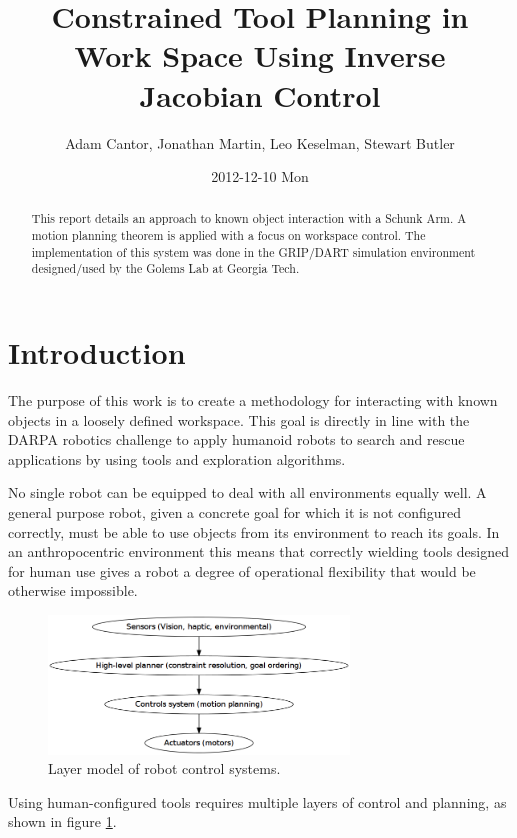 \documentclass[10pt, conference]{IEEEtran}
\title{Constrained Tool Planning in Work Space Using Inverse Jacobian Control}
\author{Adam Cantor, Jonathan Martin, Leo Keselman, Stewart Butler}
\date{2012-12-10 Mon}
\begin{document}
\maketitle






\begin{abstract}
This report details an approach to known object interaction with a
Schunk Arm. A motion planning theorem is applied with a focus on
workspace control. The implementation of this system was done in the
GRIP/DART simulation environment designed/used by the Golems Lab at
Georgia Tech.
\end{abstract}

\section{Introduction}
\label{sec-1}

  The purpose of this work is to create a methodology for interacting
  with known objects in a loosely defined workspace. This goal is
  directly in line with the DARPA robotics challenge to apply humanoid
  robots to search and rescue applications by using tools and
  exploration algorithms.

  No single robot can be equipped to deal with all environments equally
  well. A general purpose robot, given a concrete goal for which it is
  not configured correctly, must be able to use objects from its
  environment to reach its goals. In an anthropocentric environment this
  means that correctly wielding tools designed for human use gives a
  robot a degree of operational flexibility that would be otherwise
  impossible.


\begin{figure}[htb]
\centering
\includegraphics[width=8cm]{robot_layer_model_04acea6317138ac7fb5e808de063a70455ba7e53.png}
\caption{\label{fig:layer_model}Layer model of robot control systems.}
\end{figure}


  Using human-configured tools requires multiple layers of control and
  planning, as shown in figure \ref{fig:layer_model}.
\end{document}
